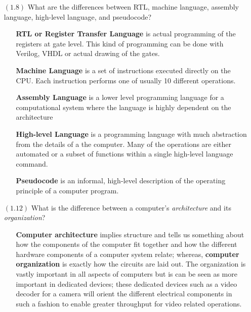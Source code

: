 \documentclass[letterpaper,12pt,titlepage]{article}
\begin{document}
\begin{enumerate}
\item[$(1.8)$] What are the differences between RTL, machine language, assembly language,
  high-level language, and pseudocode?
  \begin{enumerate}
  \item[] \textbf{RTL or Register Transfer Language} is actual programming of the registers at gate level. This kind of programming can be done with Verilog, VHDL or actual drawing of the gates. 
  \item[] \textbf{Machine Language} is a set of instructions executed directly on the CPU. Each instruction performs one of usually 10 different operations. 
  \item[] \textbf{Assembly Language} is a lower level programming language for a computational system where the language is highly dependent on the architecture
  \item[] \textbf{High-level Language} is a programming language with much abstraction from the details of a the computer. Many of the operations are either automated or a subset of functions within a single high-level language command. 
  \item[] \textbf{Pseudocode} is an informal, high-level description of the operating principle of a computer program.
  \end{enumerate}
  
\item[$(1.12)$]What is the difference between a computer's \textit{architecture} and its
  \textit{organization}?
  \begin{enumerate}
\item[] \textbf{Computer architecture} implies structure and tells us something about how the components of the computer fit together and how the different hardware components of a computer system relate; whereas, \textbf{computer organization} is exactly how the circuits are laid out. The organization is vastly important in all aspects of computers but is can be seen as more important in dedicated devices; these dedicated devices such as a video decoder for a camera will orient the different electrical components in such a fashion to enable greater throughput for video related operations. \cite{Shahzad}
  \end{enumerate}
  

\end{enumerate}
\end{document}
